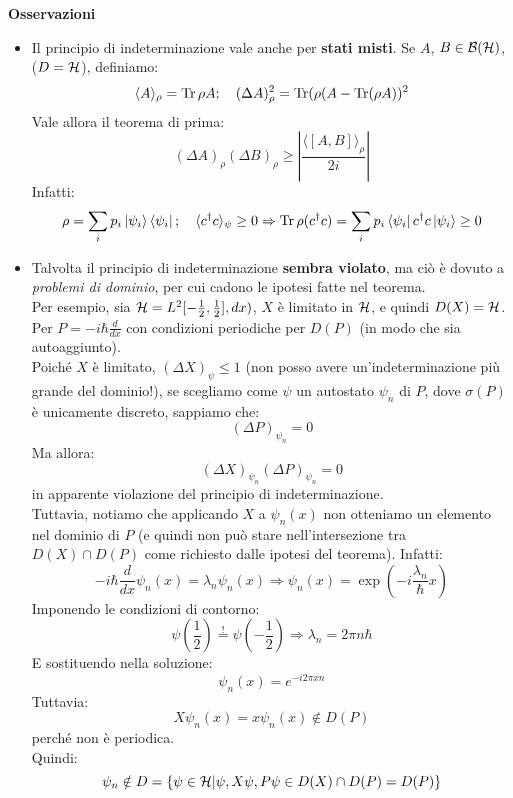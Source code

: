 \documentclass[../../FisicaTeorica.tex]{subfiles}
\begin{document}
\textbf{Osservazioni}
\begin{itemize}
\item Il principio di indeterminazione vale anche per \textbf{stati misti}. Se $A$, $B \in \mathcal{B}(\mathcal{H})$, ($D=\mathcal{H}$), definiamo:
\[
\langle A\rangle_\rho = \operatorname{Tr} \rho A; \quad (\Delta A)^2_\rho = \operatorname{Tr}(\rho(A-\operatorname{Tr}(\rho A))^2
\]
Vale allora il teorema di prima:
\[
(\Delta A)_\rho (\Delta B)_\rho \geq \left |
\frac{\langle [A,B]\rangle_\rho}{2i}
\right|
\]
Infatti:
\[
\rho = \sum_i p_i \ket{\psi_i}\bra{\psi_i}; \quad \langle c^\dag c\rangle_\psi \geq 0 \Rightarrow \operatorname{Tr}\rho(c^\dag c)=\sum_i p_i\bra{\psi_i}c^\dag c\ket{\psi_i}\geq 0
\]
\item Talvolta il principio di indeterminazione \textbf{sembra violato}, ma ciò è dovuto a \textit{problemi di dominio}, per cui cadono le ipotesi fatte nel teorema.\\
Per esempio, sia $\mathcal{H}=L^2[-\frac{1}{2}, \frac{1}{2}], dx)$, $X$ è limitato in $\mathcal{H}$, e quindi $D(X)=\mathcal{H}$.\\
Per $P=-i\hbar\frac{d}{dx}$ con condizioni periodiche per $D(P)$ (in modo che sia autoaggiunto).\\
Poiché $X$ è limitato, $(\Delta X)_\psi \leq 1$ (non posso avere un'indeterminazione più grande del dominio!), se scegliamo come $\psi$ un autostato $\psi_n$ di $P$, dove $\sigma(P)$ è unicamente discreto, sappiamo che:
\[
(\Delta P)_{\psi_n} = 0
\]
Ma allora:
\[
(\Delta X)_{\psi_n}(\Delta P)_{\psi_n}=0
\]
in apparente violazione del principio di indeterminazione.\\
Tuttavia, notiamo che applicando $X$ a $\psi_n(x)$ non otteniamo un elemento nel dominio di $P$ (e quindi non può stare nell'intersezione tra $D(X)\cap D(P)$ come richiesto dalle ipotesi del teorema). Infatti:
\[
-i\hbar \frac{d}{dx}\psi_n(x)=\lambda_n \psi_n(x)\Rightarrow \psi_n(x)=\exp\left( -i\frac{\lambda_n}{\hbar}x\right)
\]
Imponendo le condizioni di contorno:
\[
\psi\left(\frac{1}{2}\right)\overset{!}{=}\psi\left(-\frac{1}{2}\right) \Rightarrow \lambda_n = 2\pi n\hbar
\]
E sostituendo nella soluzione:
\[
\psi_n(x)=e^{-i2\pi x n}
\]
Tuttavia:
\[
X\psi_n(x)=x\psi_n(x) \notin D(P)
\]
perché non è periodica.\\
Quindi:
\[
\psi_n \notin D=\{\psi\in \mathcal{H}|\psi, X\psi, P\psi \in D(X)\cap D(P) = D(P)\}
\]

\end{itemize}
\end{document}
